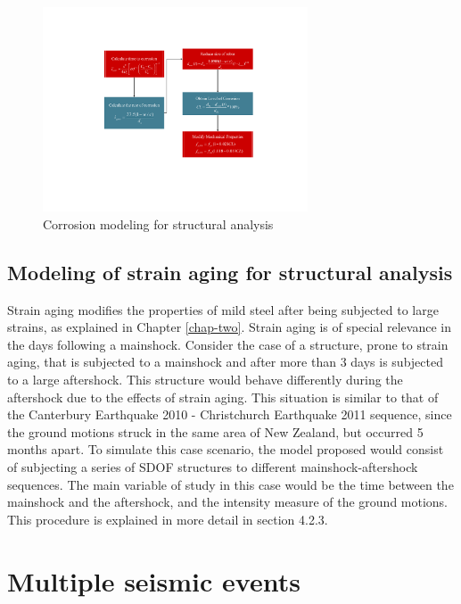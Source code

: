 \begin{figure}[htbp]
	\centering
	\includegraphics[width=0.7\textwidth]{Chapter-5/figs/Corrosion_Modeling}
	\caption{Corrosion modeling for structural analysis}
	\label{fig:CorrModel}
\end{figure}
\subsection{Modeling of strain aging for structural analysis}
Strain aging modifies the properties of mild steel after being subjected to large strains, as explained in Chapter \ref{chap-two}. Strain aging is of special relevance in the days following a mainshock. Consider the case of a structure, prone to strain aging, that is subjected to a mainshock and after more than 3 days is subjected to a large aftershock. This structure would behave differently during the aftershock due to the effects of strain aging. This situation is similar to that of the Canterbury Earthquake 2010 - Christchurch Earthquake 2011 sequence, since the ground motions struck in the same area of New Zealand, but occurred 5 months apart. To simulate this case scenario, the model proposed would consist of subjecting a series of SDOF structures to different mainshock-aftershock sequences.  The main variable of study in this case would be the time between the mainshock and the aftershock, and the intensity measure of the ground motions. This procedure is explained in more detail in section 4.2.3. 

\section{Multiple seismic events}

